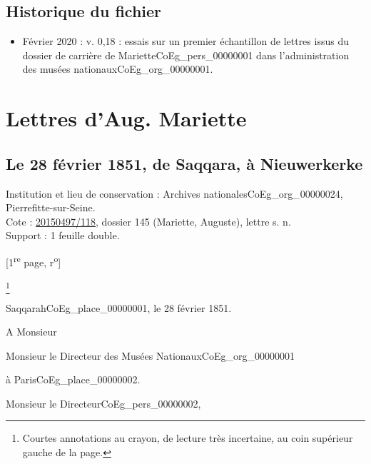 \documentclass{book}
\begin{document}
\section*{Historique du fichier}
\begin{itemize}
\item Février 2020 : v. 0,18 : essais sur un premier échantillon de lettres issus du dossier de carrière de Mariette\gls{CoEg_pers_00000001} dans l'administration des musées nationaux\gls{CoEg_org_00000001}.
\end{itemize}
\chapter*{Lettres d'Aug. Mariette}
\section*{Le 28 février 1851, de Saqqara, à Nieuwerkerke} \label{CoEg_Mariette_1851-02-28} 
{\footnotesize
\noindent Institution et lieu de conservation : Archives nationales\gls{CoEg_org_00000024}, Pierrefitte-sur-Seine.\\
Cote : \hyperref[CoEg_Mariette_ms_001]{20150497/118}, dossier 145 (Mariette, Auguste), lettre s. n.\\
Support : 1 feuille double.
\begin{center} {[1\textsuperscript{re} page, r\textsuperscript{o}]}\end{center}}
\footnote{Courtes annotations au crayon, de lecture très incertaine, au coin supérieur gauche de la page.}
\begin{flushright}
Saqqarah\gls{CoEg_place_00000001}, le 28 février 1851.
\end{flushright}
A Monsieur
\begin{center} Monsieur le Directeur des Musées Nationaux\gls{CoEg_org_00000001}\end{center}
\begin{flushright}à Paris\gls{CoEg_place_00000002}.\end{flushright}

\hspace{1cm} Monsieur le Directeur\gls{CoEg_pers_00000002},\\
\end{document}

